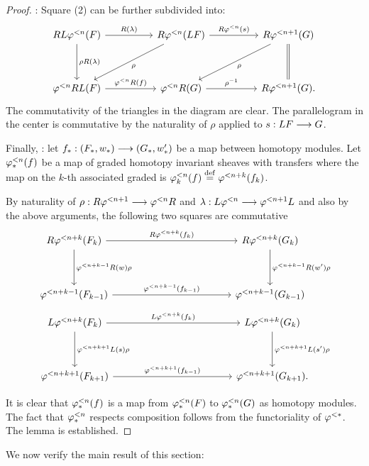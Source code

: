 \begin{proof}
 : Square (2) can be further 
subdivided into:
\[
\begin{tikzcd}[row sep=huge, column sep=huge]
RL\tlHI{n}(F) \arrow{r}{R(\lambda)} \arrow{d}{\rho R(\lambda)} &
R\tlHI{n}(LF) \arrow{ld}{\rho} \arrow{r}{R\tlHI{n}(\susp)} &
R\tlHI{n + 1}(G) \arrow{ld}{\rho} \arrow[equals]{d} \\
\tlHI{n} RL(F) \arrow{r}{\tlHI{n} R(f)} &
\tlHI{n} R(G) \arrow{r}{\rho^{-1}} &
R\tlHI{n + 1}(G).
\end{tikzcd}
\]
The commutativity of the triangles in the diagram are clear. The 
parallelogram in the center is commutative by the naturality of
$\rho$ applied to $\susp: LF \to G$.

Finally, 
 : let $f_*: (F_*,\deloop_*) \to 
(G_*, \deloop_*')$ be a map between homotopy modules. Let 
$\tlHM{n}(f)$ be a map of graded homotopy invariant sheaves with 
transfers where the map on the $k$-th associated graded is 
$\tlHM[k]{n}(f) \defeq \tlHI{n + k}(f_k)$. 

By naturality of $\rho : R\tlHI{n + 1} \to \tlHI{n} R$ and 
$\lambda: L\tlHI{n} \to \tlHI{n + 1}L$ and also by the above 
arguments, the following two squares are commutative
\[
\begin{tikzcd}[column sep=12em, row sep=huge]
R\tlHI{n + k}(F_k) \arrow{r}{R \tlHI{n + k}(f_k)} 
   \arrow{d}{\tlHI{n + k - 1}R(\deloop) \rho} &
R\tlHI{n + k}(G_k) 
   \arrow{d}{\tlHI{n + k - 1}R(\deloop') \rho} \\
\tlHI{n + k - 1}(F_{k - 1}) 
   \arrow{r}{\tlHI{n + k - 1}(f_{k - 1})} &
\tlHI{n + k - 1}(G_{k - 1}) 
\end{tikzcd}
\]
\[
\begin{tikzcd}[column sep=12em, row sep=huge]
L\tlHI{n + k}(F_k) \arrow{r}{L \tlHI{n + k}(f_k)} 
   \arrow{d}{\tlHI{n + k + 1}L(\susp) \rho} &
L\tlHI{n + k}(G_k) 
   \arrow{d}{\tlHI{n + k + 1}L(\susp') \rho} \\
\tlHI{n + k + 1}(F_{k + 1}) 
   \arrow{r}{\tlHI{n + k + 1}(f_{k - 1})} &
\tlHI{n + k + 1}(G_{k + 1}).
\end{tikzcd}
\]

It is clear that $\tlHM{n}(f)$ is a map from $\tlHM{n}(F)$ to 
$\tlHM{n}(G)$ as homotopy modules. The fact that $\tlHM{n}$ 
respects composition follows from the functoriality of $\tlHI{*}$.
The lemma is established.
\end{proof}

We now verify the main result of this section:

